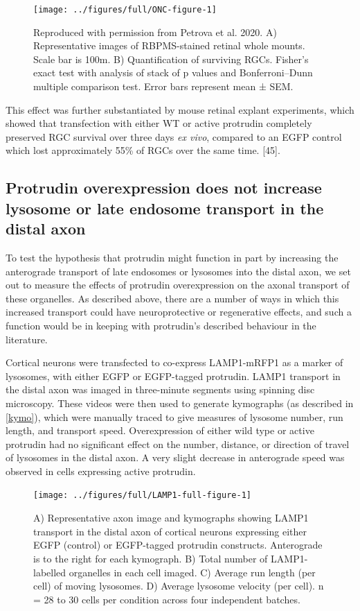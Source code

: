 \documentclass[
  12pt,
  a4paper,
]{book}
\begin{document}
\begin{figure}
\texttt{[image: ../figures/full/ONC-figure-1]} \caption[RGC neuroprotection experiment from Petrova et al. 2020]{Reproduced with permission from Petrova et al. 2020.  A) Representative images of RBPMS-stained retinal whole mounts.  Scale bar is 100\textmu{}m.  B) Quantification of surviving RGCs.   Fisher’s exact test with analysis of stack of p values and Bonferroni–Dunn multiple comparison test. Error bars represent mean ± SEM.}\label{fig:ONC-figure}
\end{figure}

This effect was further substantiated by mouse retinal explant experiments, which showed that transfection with either WT or active protrudin completely preserved RGC survival over three days \emph{ex vivo}, compared to an EGFP control which lost approximately 55\% of RGCs over the same time. {[}45{]}.

\hypertarget{lyso-LE}{%
\subsection{Protrudin overexpression does not increase lysosome or late endosome transport in the distal axon}\label{lyso-LE}}

To test the hypothesis that protrudin might function in part by increasing the anterograde transport of late endosomes or lysosomes into the distal axon, we set out to measure the effects of protrudin overexpression on the axonal transport of these organelles. As described above, there are a number of ways in which this increased transport could have neuroprotective or regenerative effects, and such a function would be in keeping with protrudin's described behaviour in the literature.

Cortical neurons were transfected to co-express LAMP1-mRFP1 as a marker of lysosomes, with either EGFP or EGFP-tagged protrudin. LAMP1 transport in the distal axon was imaged in three-minute segments using spinning disc microscopy. These videos were then used to generate kymographs (as described in \ref{kymo}), which were manually traced to give measures of lysosome number, run length, and transport speed. Overexpression of either wild type or active protrudin had no significant effect on the number, distance, or direction of travel of lysosomes in the distal axon. A very slight decrease in anterograde speed was observed in cells expressing active protrudin.

\begin{figure}
\texttt{[image: ../figures/full/LAMP1-full-figure-1]} \caption[Protrudin effect on lysosome (LAMP1) transport in the distal axon]{A) Representative axon image and kymographs showing LAMP1 transport in the distal axon of cortical neurons expressing either EGFP (control) or EGFP-tagged protrudin constructs.  Anterograde is to the right for each kymograph.  B) Total number of LAMP1-labelled organelles in each cell imaged.  C) Average run length (per cell) of moving lysosomes.  D) Average lysosome velocity (per cell).  n = 28 to 30 cells per condition across four independent batches.}\label{fig:LAMP1-full-figure}
\end{figure}
\end{document}
